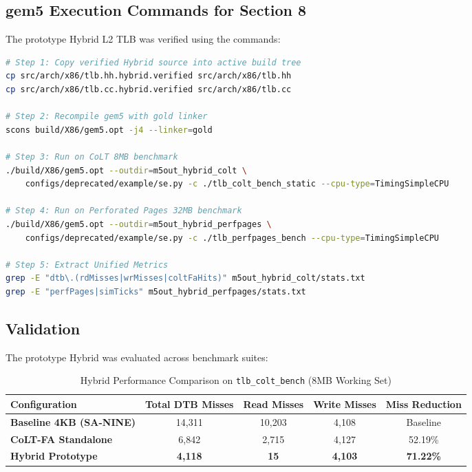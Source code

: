 \subsection{gem5 Execution Commands for Section 8}
The prototype Hybrid L2 TLB was verified using the commands:

\begin{lstlisting}[language=bash,caption={Compilation and Execution Commands for Hybrid L2 TLB},label={lst:cmd_grand_hybrid}]
# Step 1: Copy verified Hybrid source into active build tree
cp src/arch/x86/tlb.hh.hybrid.verified src/arch/x86/tlb.hh
cp src/arch/x86/tlb.cc.hybrid.verified src/arch/x86/tlb.cc

# Step 2: Recompile gem5 with gold linker
scons build/X86/gem5.opt -j4 --linker=gold

# Step 3: Run on CoLT 8MB benchmark
./build/X86/gem5.opt --outdir=m5out_hybrid_colt \
    configs/deprecated/example/se.py -c ./tlb_colt_bench_static --cpu-type=TimingSimpleCPU

# Step 4: Run on Perforated Pages 32MB benchmark
./build/X86/gem5.opt --outdir=m5out_hybrid_perfpages \
    configs/deprecated/example/se.py -c ./tlb_perfpages_bench --cpu-type=TimingSimpleCPU

# Step 5: Extract Unified Metrics
grep -E "dtb\.(rdMisses|wrMisses|coltFaHits)" m5out_hybrid_colt/stats.txt
grep -E "perfPages|simTicks" m5out_hybrid_perfpages/stats.txt
\end{lstlisting}

\subsection{Validation}
The prototype Hybrid was evaluated across benchmark suites:

\begin{table}[H]
\centering
\small
\caption{Hybrid Performance Comparison on \texttt{tlb\_colt\_bench} (8MB Working Set)}
\label{tab:grand_hybrid_colt}
\begin{tabularx}{\textwidth}{lcccc}
\toprule
\textbf{Configuration} & \textbf{Total DTB Misses} & \textbf{Read Misses} & \textbf{Write Misses} & \textbf{Miss Reduction} \\
\midrule
\textbf{Baseline 4KB (SA-NINE)} & 14,311 & 10,203 & 4,108 & Baseline \\
\textbf{CoLT-FA Standalone} & 6,842 & 2,715 & 4,127 & 52.19\% \\
\textbf{Hybrid Prototype} & \textbf{4,118} & \textbf{15} & \textbf{4,103} & \textbf{71.22\%} \\
\bottomrule
\end{tabularx}
\end{table}

